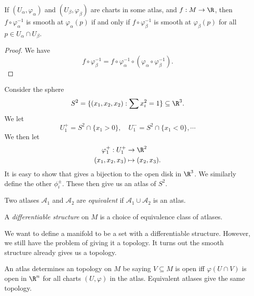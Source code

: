 \documentclass[a4paper]{article}
\begin{document}
\begin{lemma}
  If $(U_\alpha, \varphi_\alpha)$ and $(U_\beta, \varphi_\beta)$ are charts in some atlas, and $f: M \to \R$, then $f \circ \varphi_\alpha^{-1}$ is smooth at $\varphi_\alpha(p)$ if and only if $f \circ \varphi_\beta^{-1}$ is smooth at $\varphi_\beta (p)$ for all $p \in U_\alpha \cap U_\beta$.
\end{lemma}

\begin{proof}
  We have
  \[
    f \circ \varphi_\beta^{-1} = f \circ \varphi_\alpha^{-1} \circ (\varphi_\alpha \circ \varphi_\beta^{-1}).
  \]
\end{proof}

\begin{eg}
  Consider the sphere
  \[
    S^2 = \{(x_1, x_2, x_2): \sum x_i^2 = 1\} \subseteq \R^3.
  \]
  We let
  \[
    U_1^+ = S^2 \cap \{x_1 > 0\},\quad U_1^- = S^2 \cap \{x_1 < 0\}, \cdots
  \]
  We then let
  \begin{align*}
    \varphi_1^+: U_1^+ &\to \R^2\\
    (x_1, x_2, x_3) &\mapsto (x_2, x_3).
  \end{align*}
  It is easy to show that gives a bijection to the open disk in $\R^3$. We similarly define the other $\phi_i^{\pm}$. These then give us an atlas of $S^2$.
\end{eg}

\begin{defi}
  Two atlases $\mathcal{A}_1$ and $\mathcal{A}_2$ are \emph{equivalent} if $\mathcal{A}_1 \cup \mathcal{A}_2$ is an atlas.
\end{defi}

\begin{defi}
  A \emph{differentiable structure} on $M$ is a choice of equivalence class of atlases.
\end{defi}

We want to define a manifold to be a set with a differentiable structure. However, we still have the problem of giving it a topology. It turns out the smooth structure already gives us a topology.

\begin{ex}
  An atlas determines an topology on $M$ be saying $V \subseteq M$ is open iff $\varphi(U \cap V)$ is open in $\R^n$ for all charts $(U, \varphi)$ in the atlas. Equivalent atlases give the same topology.
\end{ex}
\end{document}
